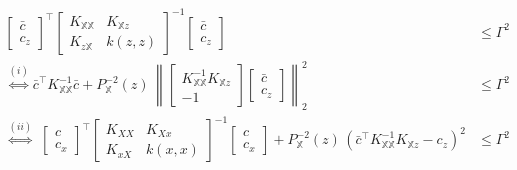 \begin{my_proof}
	\begin{subequations}
		\begin{align}
			\begin{bmatrix}
				\bar c \\
				c_z
			\end{bmatrix}^\top 
			\begin{bmatrix}
				K_{\mathds{X} \mathds{X} } & K_{\mathds{X}  z} \\
				K_{z \mathds{X} } & k(z,z)
			\end{bmatrix}^{-1} 
			\begin{bmatrix}
				\bar c \\
				c_z
			\end{bmatrix} & \leq \Gamma^2 \\
			\overset{(i)}{\Leftrightarrow}
			\bar c^\top K_{\mathds{X} \mathds{X} }^{-1} \bar c +
			P_{\mathds{X} }^{-2}(z) \, 
			\left\|
			\begin{bmatrix}
				K_{\mathds{X} \mathds{X} }^{-1} K_{\mathds{X} z} \\
				-1
			\end{bmatrix}
			\begin{bmatrix}
				\bar c \\
				c_z
			\end{bmatrix}\right\|_2^2
			& \leq \Gamma^2 \\
			\overset{(ii)}{\Leftrightarrow} \;
			\begin{bmatrix}
				c \\
				c_x
			\end{bmatrix}^\top 
			\begin{bmatrix}
				K_{XX} & K_{Xx} \\
				K_{xX} & k(x,x)
			\end{bmatrix}^{-1} 
			\begin{bmatrix}
				c \\
				c_x
			\end{bmatrix} \label{eq.tightenedConstr}%
			+
			P_{\mathds{X} }^{-2}(z) \, \left( \bar c^\top K_{\mathds{X} \mathds{X} }^{-1} K_{\mathds{X} z} - c_z \right)^2 
			&\leq \Gamma^2 

\end{align}
\end{subequations}
\end{my_proof}
